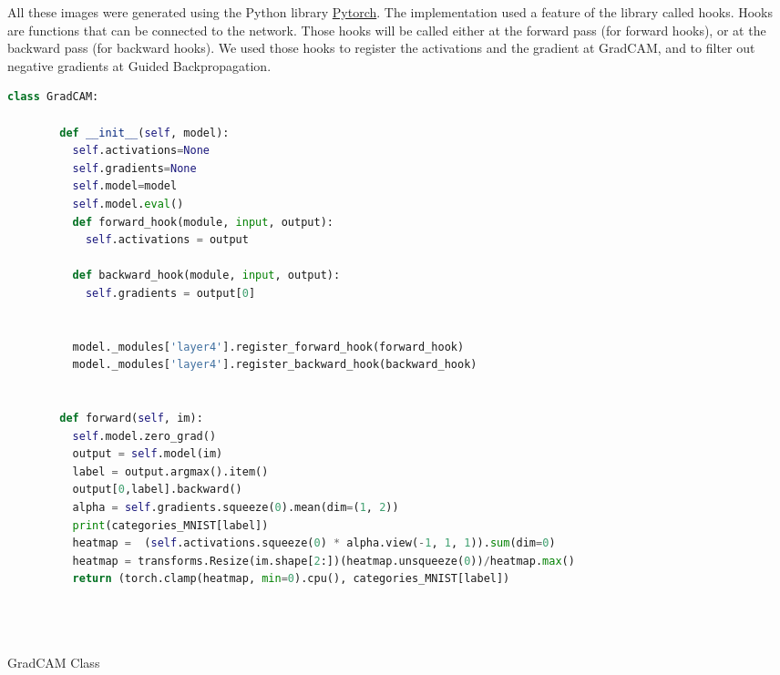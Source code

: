 All these images were generated using the Python library \href{https://pytorch.org/}{Pytorch}. The implementation used a feature of the library called hooks. Hooks are functions that can be connected to the network. Those hooks will be called either at the forward pass (for forward hooks), or at the backward pass (for backward hooks). We used those hooks to register the activations and the gradient at GradCAM, and to filter out negative gradients at Guided Backpropagation.
\begin{program}
    \centering
    \label{code:gradcam_class}
    \begin{lstlisting}[language=Python, style=wider]
        class GradCAM:

        def __init__(self, model):
          self.activations=None
          self.gradients=None
          self.model=model
          self.model.eval()
          def forward_hook(module, input, output):
            self.activations = output
      
          def backward_hook(module, input, output):
            self.gradients = output[0]
      
      
          model._modules['layer4'].register_forward_hook(forward_hook)
          model._modules['layer4'].register_backward_hook(backward_hook)
      
      
        def forward(self, im):
          self.model.zero_grad()
          output = self.model(im)
          label = output.argmax().item()
          output[0,label].backward()
          alpha = self.gradients.squeeze(0).mean(dim=(1, 2))
          print(categories_MNIST[label])
          heatmap =  (self.activations.squeeze(0) * alpha.view(-1, 1, 1)).sum(dim=0)
          heatmap = transforms.Resize(im.shape[2:])(heatmap.unsqueeze(0))/heatmap.max()
          return (torch.clamp(heatmap, min=0).cpu(), categories_MNIST[label])
      
      
      
    \end{lstlisting}

    \caption{GradCAM Class}

    
\end{program}

